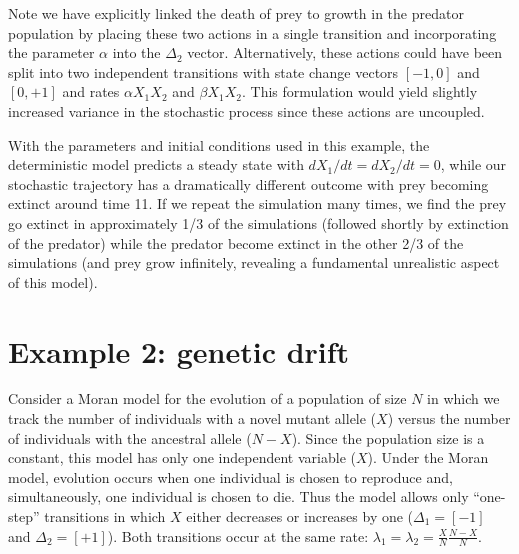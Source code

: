 \documentclass[11pt,nogin]{article}
\begin{document}
Note we have explicitly linked the death of prey to growth in the predator population by placing these two actions in a single transition and incorporating the parameter $\alpha$ into the $\Delta_{2}$ vector. Alternatively, these actions could have been split into two independent transitions with state change vectors $[-1,0]$ and $[0,+1]$ and rates $\alpha X_{1}X_{2}$ and $\beta X_{1}X_{2}$. This formulation would yield slightly increased variance in the stochastic process since these actions are uncoupled.

With the parameters and initial conditions used in this example, the deterministic model predicts a steady state with $dX_{1}/dt=dX_{2}/dt=0$, while our stochastic trajectory has a dramatically different outcome with prey becoming extinct around time 11. If we repeat the simulation many times, we find the prey go extinct in approximately 1/3 of the simulations (followed shortly by extinction of the predator) while the predator become extinct in the other 2/3 of the simulations
(and prey grow infinitely, revealing a fundamental unrealistic aspect of this model).


\section*{Example 2: genetic drift}
Consider a Moran model for the evolution of a population of size $N$ in which we track the number of individuals with a novel mutant allele ($X$) versus the number of individuals with the ancestral allele ($N-X$).  Since the population size is a constant, this model has only one independent variable ($X$).  Under the Moran model, evolution occurs when one individual is chosen to reproduce and, simultaneously, one individual is chosen to die.  Thus the model allows only ``one-step'' transitions in which $X$ either decreases or increases by one ($\Delta_1=[-1]$ and $\Delta_2=[+1]$).  Both transitions occur at the same rate: $\lambda_1 = \lambda_2 = \frac{X}{N}\frac{N-X}{N}$.
\end{document}
